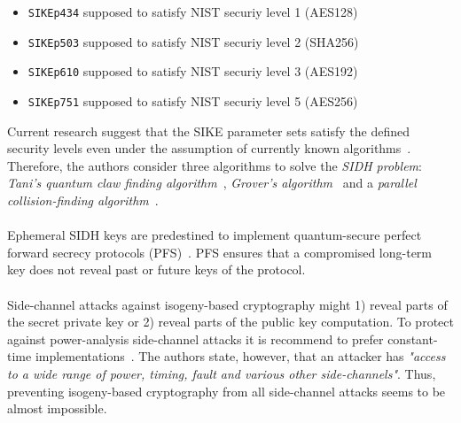 \begin{itemize}
\itemsep0em 
	\item \texttt{SIKEp434} supposed to satisfy \gls{NIST} securiy level 1 (AES128)
	\item \texttt{SIKEp503} supposed to satisfy \gls{NIST} securiy level 2 (SHA256)
	\item \texttt{SIKEp610} supposed to satisfy \gls{NIST} securiy level 3 (AES192)
	\item \texttt{SIKEp751} supposed to satisfy \gls{NIST} securiy level 5 (AES256)
\end{itemize}
Current research suggest that the \gls{SIKE} parameter sets satisfy the defined security levels even under the assumption of currently known algorithms~\parencite{jaques2019quantum}. Therefore, the authors consider three algorithms to solve the \textit{\gls{SIDH} problem}: \textit{Tani's quantum claw finding algorithm}~\parencite{tani2009claw}, \textit{Grover's algorithm}~\parencite{grover1996fast} and a \textit{parallel collision-finding algorithm}~\parencite{van1999parallel}.
\\\\
Ephemeral \gls{SIDH} keys are predestined to implement quantum-secure perfect forward secrecy protocols (\gls{PFS})~\parencite{koziel2018high}. \gls{PFS} ensures that a compromised long-term key does not reveal past or future keys of the protocol.
\\\\
Side-channel attacks against isogeny-based cryptography might 1) reveal parts of the secret private key or 2) reveal parts of the public key computation. To protect against power-analysis side-channel attacks it is recommend to prefer constant-time implementations~\parencite{sike2020spec}. The authors state, however, that an attacker has \textit{"access to a wide range of power, timing, fault and various other side-channels"}. Thus, preventing isogeny-based cryptography from all side-channel attacks seems to be almost impossible.
